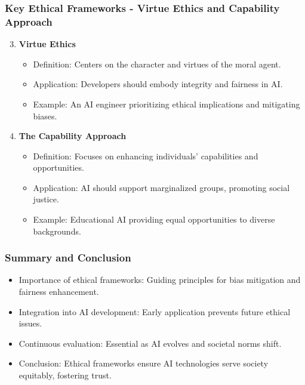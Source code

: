 \documentclass{beamer}
\begin{document}
\begin{frame}[fragile]
    \frametitle{Key Ethical Frameworks - Virtue Ethics and Capability Approach}
    \begin{enumerate}
        \setcounter{enumi}{2}
        \item \textbf{Virtue Ethics}
            \begin{itemize}
                \item Definition: Centers on the character and virtues of the moral agent.
                \item Application: Developers should embody integrity and fairness in AI.
                \item Example: An AI engineer prioritizing ethical implications and mitigating biases.
            \end{itemize}

        \item \textbf{The Capability Approach}
            \begin{itemize}
                \item Definition: Focuses on enhancing individuals' capabilities and opportunities.
                \item Application: AI should support marginalized groups, promoting social justice.
                \item Example: Educational AI providing equal opportunities to diverse backgrounds.
            \end{itemize}
    \end{enumerate}
\end{frame}

\begin{frame}[fragile]
    \frametitle{Summary and Conclusion}
    \begin{itemize}
        \item Importance of ethical frameworks: Guiding principles for bias mitigation and fairness enhancement.
        \item Integration into AI development: Early application prevents future ethical issues.
        \item Continuous evaluation: Essential as AI evolves and societal norms shift.
        \item Conclusion: Ethical frameworks ensure AI technologies serve society equitably, fostering trust.
    \end{itemize}
\end{frame}
\end{document}
